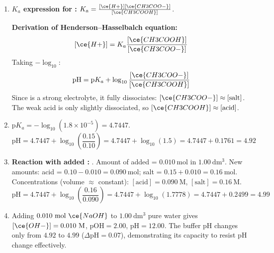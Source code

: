\documentclass[11pt]{article}
\begin{document}
\begin{corrige}
\begin{enumerate}
\item \textbf{$K_a$ expression for :} $K_a = \frac{[\ce{H+}][\ce{CH3COO-}]}{[\ce{CH3COOH}]}$.
\par \textbf{Derivation of Henderson–Hasselbalch equation:}
\[
[\ce{H+}] = K_a \frac{[\ce{CH3COOH}]}{[\ce{CH3COO-}]}
\]
Taking $-\log_{10}$:
\[
\mathrm{pH} = \mathrm{p}K_a + \log_{10}\frac{[\ce{CH3COO-}]}{[\ce{CH3COOH}]}
\]
Since  is a strong electrolyte, it fully dissociates: $[\ce{CH3COO-}] \approx [\text{salt}]$. The weak acid is only slightly dissociated, so $[\ce{CH3COOH}] \approx [\text{acid}]$.
\item $\mathrm{p}K_a = -\log_{10}(1.8\times 10^{-5}) = 4.7447$.
\[
\mathrm{pH} = 4.7447 + \log_{10}\left(\frac{0.15}{0.10}\right) = 4.7447 + \log_{10}(1.5) = 4.7447 + 0.1761 = \mathbf{4.92}
\]
\item \textbf{Reaction with added :} .
Amount of  added = $0.010\ \mathrm{mol}$ in $1.00\ \mathrm{dm^3}$.
New amounts: acid = $0.10 - 0.010 = 0.090\ \mathrm{mol}$; salt = $0.15 + 0.010 = 0.16\ \mathrm{mol}$.
Concentrations (volume $\approx$ constant): $[\text{acid}] = 0.090\ \mathrm{M}$, $[\text{salt}] = 0.16\ \mathrm{M}$.
\[
\mathrm{pH} = 4.7447 + \log_{10}\left(\frac{0.16}{0.090}\right) = 4.7447 + \log_{10}(1.7778) = 4.7447 + 0.2499 = \mathbf{4.99}
\]
\item Adding $0.010\ \mathrm{mol}\ \ce{NaOH}$ to $1.00\ \mathrm{dm^3}$ pure water gives $[\ce{OH-}] = 0.010\ \mathrm{M}$, $\mathrm{pOH}=2.00$, $\mathrm{pH}=12.00$. The buffer pH changes only from $4.92$ to $4.99$ ($\Delta\mathrm{pH}=0.07$), demonstrating its capacity to resist pH change effectively.
\end{enumerate}
\end{corrige}
\end{document}

